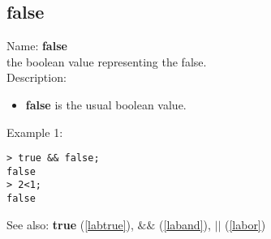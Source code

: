 \subsection{false}
\label{labfalse}
\noindent Name: \textbf{false}\\
the boolean value representing the false.\\
\noindent Description: \begin{itemize}

\item \textbf{false} is the usual boolean value.
\end{itemize}
\noindent Example 1: 
\begin{center}\begin{minipage}{15cm}\begin{Verbatim}[frame=single]
> true && false;
false
> 2<1;
false
\end{Verbatim}
\end{minipage}\end{center}
See also: \textbf{true} (\ref{labtrue}), \textbf{$\&\&$} (\ref{laband}), \textbf{$||$} (\ref{labor})
